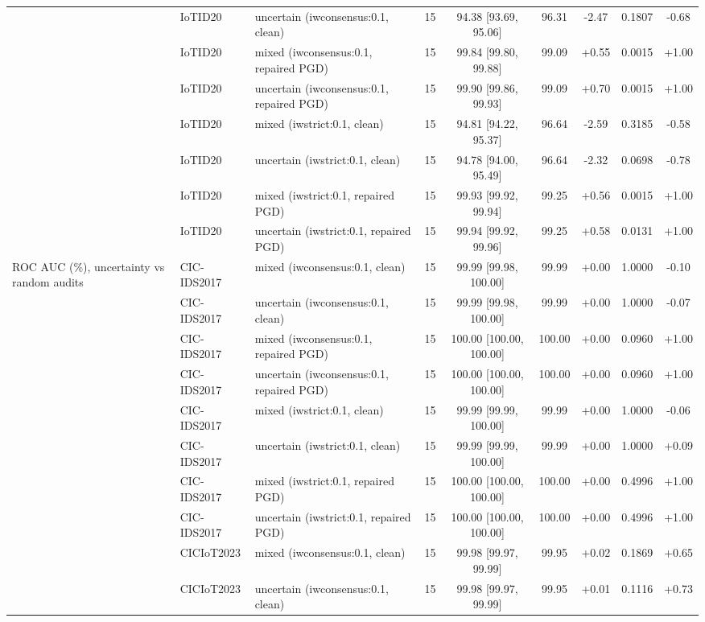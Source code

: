\begin{table}[t]
\begin{tabular}{lllcccccc}
 & IoTID20 & uncertain (iwconsensus:0.1, clean) & 15 & 94.38 [93.69, 95.06] & 96.31 & -2.47 & 0.1807 & -0.68 \\
 & IoTID20 & mixed (iwconsensus:0.1, repaired PGD) & 15 & 99.84 [99.80, 99.88] & 99.09 & +0.55 & 0.0015 & +1.00 \\
 & IoTID20 & uncertain (iwconsensus:0.1, repaired PGD) & 15 & 99.90 [99.86, 99.93] & 99.09 & +0.70 & 0.0015 & +1.00 \\
 & IoTID20 & mixed (iwstrict:0.1, clean) & 15 & 94.81 [94.22, 95.37] & 96.64 & -2.59 & 0.3185 & -0.58 \\
 & IoTID20 & uncertain (iwstrict:0.1, clean) & 15 & 94.78 [94.00, 95.49] & 96.64 & -2.32 & 0.0698 & -0.78 \\
 & IoTID20 & mixed (iwstrict:0.1, repaired PGD) & 15 & 99.93 [99.92, 99.94] & 99.25 & +0.56 & 0.0015 & +1.00 \\
 & IoTID20 & uncertain (iwstrict:0.1, repaired PGD) & 15 & 99.94 [99.92, 99.96] & 99.25 & +0.58 & 0.0131 & +1.00 \\
ROC AUC (\%), uncertainty vs random audits & CIC-IDS2017 & mixed (iwconsensus:0.1, clean) & 15 & 99.99 [99.98, 100.00] & 99.99 & +0.00 & 1.0000 & -0.10 \\
 & CIC-IDS2017 & uncertain (iwconsensus:0.1, clean) & 15 & 99.99 [99.98, 100.00] & 99.99 & +0.00 & 1.0000 & -0.07 \\
 & CIC-IDS2017 & mixed (iwconsensus:0.1, repaired PGD) & 15 & 100.00 [100.00, 100.00] & 100.00 & +0.00 & 0.0960 & +1.00 \\
 & CIC-IDS2017 & uncertain (iwconsensus:0.1, repaired PGD) & 15 & 100.00 [100.00, 100.00] & 100.00 & +0.00 & 0.0960 & +1.00 \\
 & CIC-IDS2017 & mixed (iwstrict:0.1, clean) & 15 & 99.99 [99.99, 100.00] & 99.99 & +0.00 & 1.0000 & -0.06 \\
 & CIC-IDS2017 & uncertain (iwstrict:0.1, clean) & 15 & 99.99 [99.99, 100.00] & 99.99 & +0.00 & 1.0000 & +0.09 \\
 & CIC-IDS2017 & mixed (iwstrict:0.1, repaired PGD) & 15 & 100.00 [100.00, 100.00] & 100.00 & +0.00 & 0.4996 & +1.00 \\
 & CIC-IDS2017 & uncertain (iwstrict:0.1, repaired PGD) & 15 & 100.00 [100.00, 100.00] & 100.00 & +0.00 & 0.4996 & +1.00 \\
 & CICIoT2023 & mixed (iwconsensus:0.1, clean) & 15 & 99.98 [99.97, 99.99] & 99.95 & +0.02 & 0.1869 & +0.65 \\
 & CICIoT2023 & uncertain (iwconsensus:0.1, clean) & 15 & 99.98 [99.97, 99.99] & 99.95 & +0.01 & 0.1116 & +0.73 \\

\end{tabular}
\end{table}
